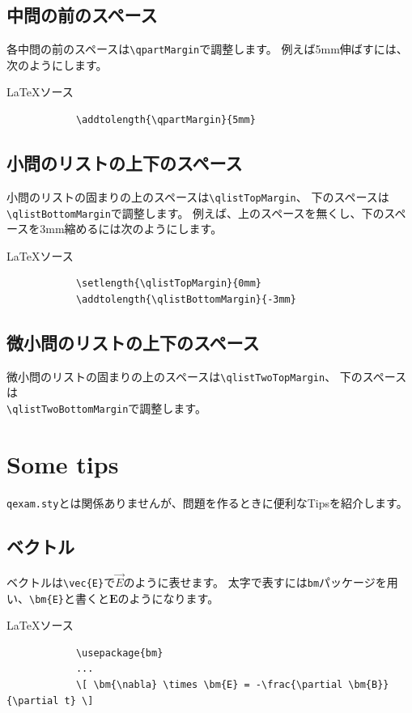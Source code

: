 \documentclass[dvipdfmx,a4j,11pt]{jarticle}
\newenvironment{inputbox}{%
	\begin{itembox}[r]{\LaTeX ソース}
}{
	\end{itembox}
}
\begin{document}
\subsection{中問の前のスペース}
	各中問の前のスペースは{\tt \verb"\qpartMargin"}で調整します。
	例えば5mm伸ばすには、次のようにします。
	\begin{inputbox}
		\begin{verbatim}
			\addtolength{\qpartMargin}{5mm}
		\end{verbatim}
	\end{inputbox}
	
\subsection{小問のリストの上下のスペース}
	小問のリストの固まりの上のスペースは{\tt \verb"\qlistTopMargin"}、
		下のスペースは\\{\tt \verb"\qlistBottomMargin"}で調整します。
		例えば、上のスペースを無くし、下のスペースを3mm縮めるには次のようにします。
	\begin{inputbox}
		\begin{verbatim}
			\setlength{\qlistTopMargin}{0mm}
			\addtolength{\qlistBottomMargin}{-3mm}
		\end{verbatim}
	\end{inputbox}

\subsection{微小問のリストの上下のスペース}
	微小問のリストの固まりの上のスペースは{\tt \verb"\qlistTwoTopMargin"}、
		下のスペースは\\{\tt \verb"\qlistTwoBottomMargin"}で調整します。

\clearpage
\section{Some tips}
	{\tt qexam.sty}とは関係ありませんが、問題を作るときに便利なTipsを紹介します。

\subsection{ベクトル}
	ベクトルは{\tt \verb"\vec{E}"}で$\vec{E}$のように表せます。
	太字で表すには{\tt bm}パッケージを用い、{\tt \verb"\bm{E}"}と書くと$\bm{E}$のようになります。
	\begin{inputbox}
		\begin{verbatim}
			\usepackage{bm}
			...
			\[ \bm{\nabla} \times \bm{E} = -\frac{\partial \bm{B}}{\partial t} \]
		\end{verbatim}
	\end{inputbox}
	
\end{document}
